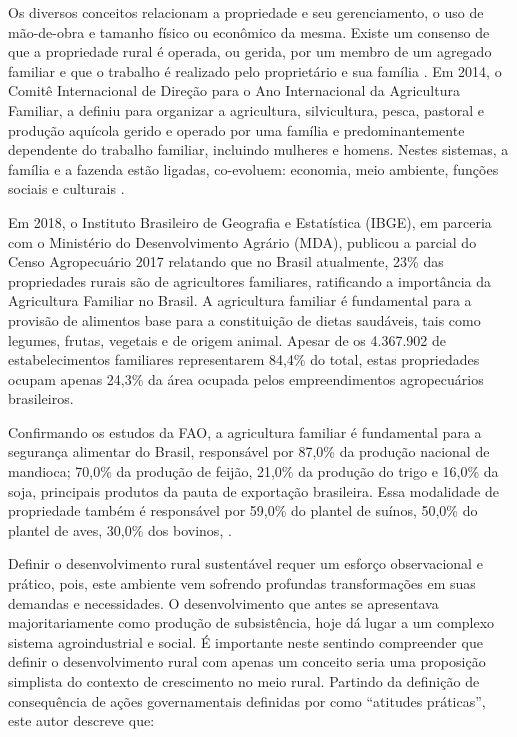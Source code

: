 


Os diversos conceitos relacionam a propriedade e seu gerenciamento, o uso de mão-de-obra e tamanho físico ou econômico da mesma. Existe um consenso de que a propriedade rural é operada, ou gerida, por um membro de um agregado familiar e que o trabalho é realizado pelo proprietário e sua família \cite{Schneider2003}. Em 2014, o Comitê Internacional de Direção para o Ano Internacional da Agricultura Familiar, a definiu para organizar a agricultura, silvicultura, pesca, pastoral e produção aquícola gerido e operado por uma família e predominantemente dependente do trabalho familiar, incluindo mulheres e homens. Nestes sistemas, a família e a fazenda estão ligadas, co-evoluem: economia, meio ambiente, funções sociais e culturais \cite{FAO2014}.

Em 2018, o Instituto Brasileiro de Geografia e Estatística (IBGE), em parceria com o Ministério do Desenvolvimento Agrário (MDA), publicou a parcial do Censo Agropecuário 2017 \cite{IBGE2018CensoParanaense} relatando que no Brasil atualmente, 23\% das propriedades rurais são de agricultores familiares, ratificando a importância da Agricultura Familiar no Brasil. A agricultura familiar é fundamental para a provisão de alimentos base para a constituição de dietas saudáveis, tais como legumes, frutas, vegetais e de origem animal. Apesar de os 4.367.902 de estabelecimentos familiares representarem 84,4\% do total, estas propriedades ocupam apenas 24,3\% da área ocupada pelos empreendimentos agropecuários brasileiros. 

Confirmando os estudos da FAO, a agricultura familiar é fundamental para a  segurança alimentar do Brasil, responsável por 87,0\% da produção nacional de mandioca; 70,0\% da produção de feijão, 21,0\% da produção do trigo e 16,0\% da soja, principais produtos da pauta de exportação brasileira. Essa modalidade de propriedade também é responsável por 59,0\% do plantel de suínos, 50,0\% do plantel de aves, 30,0\% dos bovinos, \cite{IBGE2018CensoParanaense}.

Definir o desenvolvimento rural sustentável requer um esforço observacional e prático, pois, este ambiente vem sofrendo profundas transformações em suas demandas e necessidades. O desenvolvimento que antes se apresentava majoritariamente como produção de subsistência, hoje dá lugar a um complexo sistema agroindustrial \cite{Bastos2018DeterminantesBrasileiro} e social. É importante neste sentindo compreender que definir o desenvolvimento rural com apenas um conceito seria uma proposição simplista do contexto de crescimento no meio rural. Partindo da definição de consequência de ações governamentais definidas por  como “atitudes práticas”, este autor descreve que:

